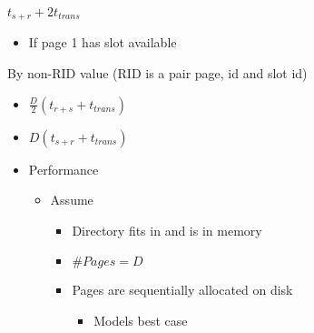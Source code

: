 \begin{itemize}
\begin{itemize}
\begin{itemize}
\begin{itemize}
\begin{itemize}
                                \end{itemize}
                        \end{itemize}
                     $t_{s + r}  + 2 t_{trans}$
                        \begin{itemize}
                            \item If page 1 has slot available
                        \end{itemize}
                     By non-RID value (RID is a pair page, id and slot id)
                        \begin{itemize}
                            \item $\frac{D}{2}(t_{r+s} + t_{trans})$
                        \end{itemize}
                        \begin{itemize}
                            \item $D(t_{s+r} + t_{trans})$
                        \end{itemize}
                \end{itemize}
        \end{itemize}
        \begin{itemize}
             Multiple pages
                \begin{itemize}
                    \item Each contains a list of pointer to data pages
                \end{itemize}
            \item Performance
                \begin{itemize}
                    \item Assume
                        \begin{itemize}
                            \item Directory fits in and is in memory
                            \item $\#Pages = D$
                            \item Pages are sequentially allocated on disk
                                \begin{itemize}
                                    \item Models best case
                                \end{itemize}
                        \end{itemize}

\end{itemize}
\end{itemize}
\end{itemize}
